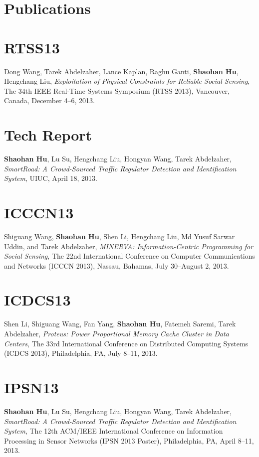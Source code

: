 \section{\sc Publications}

\section{\sc RTSS13}
Dong Wang, Tarek Abdelzaher, Lance Kaplan, Raghu Ganti,
\textbf{Shaohan Hu}, Hengchang Liu, \emph{Exploitation of Physical
  Constraints for Reliable Social Sensing}, \textsf{The 34th IEEE
  Real-Time Systems Symposium (RTSS 2013)}, Vancouver, Canada,
December 4--6, 2013.

\section{\sc Tech Report}
\textbf{Shaohan Hu}, Lu Su, Hengchang Liu, Hongyan Wang, Tarek
Abdelzaher, \emph{SmartRoad: A Crowd-Sourced Traffic Regulator
  Detection and Identification System}, \textsf{UIUC}, April 18, 2013.

\section{\sc ICCCN13}
Shiguang Wang, \textbf{Shaohan Hu}, Shen Li, Hengchang Liu, Md Yusuf
Sarwar Uddin, and Tarek Abdelzaher, \emph{MINERVA: Information-Centric
  Programming for Social Sensing}, \textsf{The 22nd International
  Conference on Computer Communications and Networks (ICCCN 2013)},
Nassau, Bahamas, July 30--August 2, 2013.

\section{\sc ICDCS13}
Shen Li, Shiguang Wang, Fan Yang, \textbf{Shaohan Hu}, Fatemeh Saremi,
Tarek Abdelzaher, \emph{Proteus: Power Proportional Memory Cache
  Cluster in Data Centers}, \textsf{The 33rd International Conference
  on Distributed Computing Systems (ICDCS 2013)}, Philadelphia, PA,
July 8--11, 2013.

\section{\sc IPSN13}
\textbf{Shaohan Hu}, Lu Su, Hengchang Liu, Hongyan Wang, Tarek
Abdelzaher, \emph{SmartRoad: A Crowd-Sourced Traffic Regulator
  Detection and Identification System}, \textsf{The 12th ACM/IEEE
  International Conference on Information Processing in Sensor
  Networks (IPSN 2013 Poster)}, Philadelphia, PA, April 8--11, 2013.

